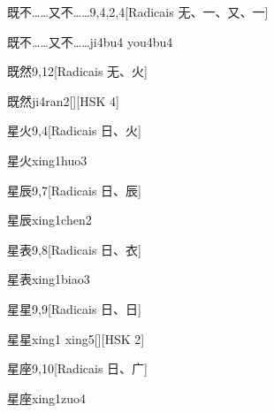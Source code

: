 \begin{entry}{既不……又不……}{9,4,2,4}[Radicais ⽆、⼀、⼜、⼀]
  \begin{phonetics}{既不……又不……}{ji4bu4 you4bu4}
  \end{phonetics}
\end{entry}

\begin{entry}{既然}{9,12}[Radicais ⽆、⽕]
  \begin{phonetics}{既然}{ji4ran2}[][HSK 4]
  \end{phonetics}
\end{entry}

\begin{entry}{星火}{9,4}[Radicais ⽇、⽕]
  \begin{phonetics}{星火}{xing1huo3}
  \end{phonetics}
\end{entry}

\begin{entry}{星辰}{9,7}[Radicais ⽇、⾠]
  \begin{phonetics}{星辰}{xing1chen2}
  \end{phonetics}
\end{entry}

\begin{entry}{星表}{9,8}[Radicais ⽇、⾐]
  \begin{phonetics}{星表}{xing1biao3}
  \end{phonetics}
\end{entry}

\begin{entry}{星星}{9,9}[Radicais ⽇、⽇]
  \begin{phonetics}{星星}{xing1 xing5}[][HSK 2]
  \end{phonetics}
\end{entry}

\begin{entry}{星座}{9,10}[Radicais ⽇、⼴]
  \begin{phonetics}{星座}{xing1zuo4}
  \end{phonetics}
\end{entry}

